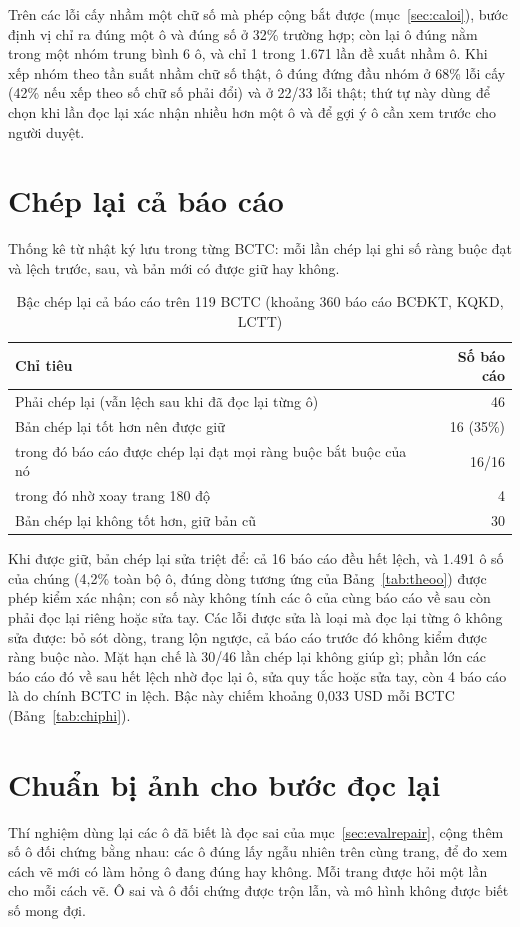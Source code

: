 \documentclass[12pt,a4paper]{report}
\begin{document}
Trên các lỗi cấy nhầm một chữ số mà phép cộng bắt được (mục~\ref{sec:caloi}), bước định vị chỉ ra đúng một ô và đúng số
ở 32\% trường hợp; còn lại ô đúng nằm trong một nhóm trung bình 6 ô, và chỉ 1 trong 1.671 lần đề xuất nhầm ô. Khi xếp
nhóm theo tần suất nhầm chữ số thật, ô đúng đứng đầu nhóm ở 68\% lỗi cấy (42\% nếu xếp theo số chữ số phải đổi) và ở
22/33 lỗi thật; thứ tự này dùng để chọn khi lần đọc lại xác nhận nhiều hơn một ô và để gợi ý ô cần xem trước cho người
duyệt.

\section{Chép lại cả báo cáo}\label{sec:evalchep}
Thống kê từ nhật ký lưu trong từng BCTC: mỗi lần chép lại ghi số ràng buộc đạt và lệch trước, sau, và bản mới có được giữ
hay không.

\begin{table}[H]
\centering\small
\caption{Bậc chép lại cả báo cáo trên 119 BCTC (khoảng 360 báo cáo BCĐKT, KQKD, LCTT)}\label{tab:chep}
\begin{tabularx}{\linewidth}{@{}Xr@{}}
\toprule
\textbf{Chỉ tiêu} & \textbf{Số báo cáo} \\ \midrule
Phải chép lại (vẫn lệch sau khi đã đọc lại từng ô) & 46 \\
Bản chép lại tốt hơn nên được giữ & 16 (35\%) \\
\quad trong đó báo cáo được chép lại đạt mọi ràng buộc bắt buộc của nó & 16/16 \\
\quad trong đó nhờ xoay trang 180 độ & 4 \\
Bản chép lại không tốt hơn, giữ bản cũ & 30 \\
\bottomrule
\end{tabularx}
\end{table}

Khi được giữ, bản chép lại sửa triệt để: cả 16 báo cáo đều hết lệch, và 1.491 ô số của chúng (4,2\% toàn bộ ô, đúng dòng
tương ứng của Bảng~\ref{tab:theoo}) được phép kiểm xác nhận; con số này không tính các ô của cùng báo cáo về sau còn
phải đọc lại riêng hoặc sửa tay. Các lỗi được sửa là loại mà đọc lại từng ô không sửa được: bỏ sót dòng, trang lộn
ngược, cả báo cáo trước đó không kiểm được ràng buộc nào. Mặt hạn chế là 30/46 lần chép lại không giúp gì; phần lớn các
báo cáo đó về sau hết lệch nhờ đọc lại ô, sửa quy tắc hoặc sửa tay, còn 4 báo cáo là do chính BCTC in lệch. Bậc này
chiếm khoảng 0,033 USD mỗi BCTC (Bảng~\ref{tab:chiphi}).

\section{Chuẩn bị ảnh cho bước đọc lại}\label{sec:evalanh}
Thí nghiệm dùng lại các ô đã biết là đọc sai của mục~\ref{sec:evalrepair}, cộng thêm số ô đối chứng bằng nhau: các ô
đúng lấy ngẫu nhiên trên cùng trang, để đo xem cách vẽ mới có làm hỏng ô đang đúng hay không. Mỗi trang được hỏi một lần
cho mỗi cách vẽ. Ô sai và ô đối chứng được trộn lẫn, và mô hình không được biết số mong đợi.
\end{document}

